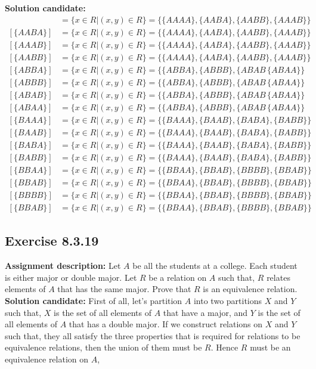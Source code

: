 \documentclass{report}
\newcommand{\mAlign}[1]{\begin{align*}#1\end{align*}}
\newcommand{\In}{\! \in \!}
\newcommand{\AssignmentDescription}{\textbf{Assignment description: }}
\newcommand{\Solution}{\textbf{Solution candidate: }}
\newcommand{\Exercise}[1]{\subsection{Exercise #1}}
\begin{document}
	\Solution
	\mAlign{
		[\{AAAA\}] &= \{x \in R | (x,y) \In R\} = \{\{AAAA\},\{AABA\},\{AABB\},\{AAAB\}\} \\
		[\{AABA\}] &= \{x \in R | (x,y) \In R\} = \{\{AAAA\},\{AABA\},\{AABB\},\{AAAB\}\} \\
		[\{AAAB\}] &= \{x \in R | (x,y) \In R\} = \{\{AAAA\},\{AABA\},\{AABB\},\{AAAB\}\} \\
		[\{AABB\}] &= \{x \in R | (x,y) \In R\} = \{\{AAAA\},\{AABA\},\{AABB\},\{AAAB\}\} \\
		[\{ABBA\}] &= \{x \in R | (x,y) \In R\} = \{\{ABBA\},\{ABBB\},\{ABAB\,\{ABAA\}\} \\
		[\{ABBB\}] &= \{x \in R | (x,y) \In R\} = \{\{ABBA\},\{ABBB\},\{ABAB\,\{ABAA\}\} \\
		[\{ABAB\}] &= \{x \in R | (x,y) \In R\} = \{\{ABBA\},\{ABBB\},\{ABAB\,\{ABAA\}\} \\
		[\{ABAA\}] &= \{x \in R | (x,y) \In R\} = \{\{ABBA\},\{ABBB\},\{ABAB\,\{ABAA\}\} \\
		[\{BAAA\}] &= \{x \in R | (x,y) \In R\} = \{\{BAAA\},\{BAAB\},\{BABA\},\{BABB\}\} \\
		[\{BAAB\}] &= \{x \in R | (x,y) \In R\} = \{\{BAAA\},\{BAAB\},\{BABA\},\{BABB\}\} \\
		[\{BABA\}] &= \{x \in R | (x,y) \In R\} = \{\{BAAA\},\{BAAB\},\{BABA\},\{BABB\}\} \\
		[\{BABB\}] &= \{x \in R | (x,y) \In R\} = \{\{BAAA\},\{BAAB\},\{BABA\},\{BABB\}\} \\
		[\{BBAA\}] &= \{x \in R | (x,y) \In R\} = \{\{BBAA\},\{BBAB\},\{BBBB\},\{BBAB\}\} \\
		[\{BBAB\}] &= \{x \in R | (x,y) \In R\} = \{\{BBAA\},\{BBAB\},\{BBBB\},\{BBAB\}\} \\
		[\{BBBB\}] &= \{x \in R | (x,y) \In R\} = \{\{BBAA\},\{BBAB\},\{BBBB\},\{BBAB\}\} \\
		[\{BBAB\}] &= \{x \in R | (x,y) \In R\} = \{\{BBAA\},\{BBAB\},\{BBBB\},\{BBAB\}\}}
	
	\Exercise{8.3.19}
	\AssignmentDescription
	Let $A$ be all the students at a college. Each student is either major or double major. Let $R$ be a relation on $A$ such that, $R$ relates elements of $A$ that has the same major. Prove that $R$ is an equivalence relation.\\
	
	\Solution
	First of all, let's partition $A$ into two partitions $X$ and $Y$ such that, $X$ is the set of all elements of $A$ that have a major, and $Y$ is the set of all elements of $A$ that has a double major. If we construct relations on $X$ and $Y$ such that, they all satisfy the three properties that is required for relations to be equivalence relations, then the union of them must be $R$. Hence $R$ must be an equivalence relation on $A$, \\
	
\end{document}
